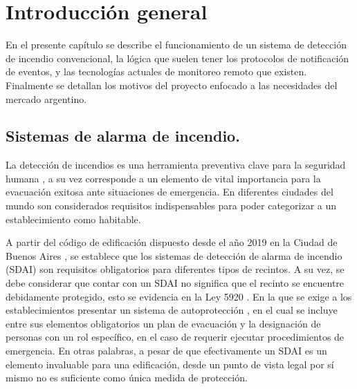 
\chapter{Introducción general} %

\label{Chapter1} %
\label{IntroGeneral}


\newcommand{\keyword}[1]{\textbf{#1}}
\newcommand{\tabhead}[1]{\textbf{#1}}
\newcommand{\code}[1]{\texttt{#1}}
\newcommand{\file}[1]{\texttt{\bfseries#1}}
\newcommand{\option}[1]{\texttt{\itshape#1}}
\newcommand{\grados}{$^{\circ}$}


En el presente capítulo se describe el funcionamiento de un sistema de detección de incendio convencional, la lógica que suelen tener los protocolos de notificación de eventos, y las tecnologías actuales de monitoreo remoto que existen. Finalmente se detallan los motivos del proyecto enfocado a las necesidades del mercado argentino. 


\section{Sistemas de alarma de incendio.}
%
La detección de incendios es una herramienta preventiva clave para la seguridad humana \citep{rev_innov_1}, a su vez corresponde a un elemento de vital importancia para la evacuación exitosa ante situaciones de emergencia. En diferentes ciudades del mundo son considerados requisitos indispensables para poder categorizar a un establecimiento como habitable.

A partir del código de edificación dispuesto desde el año 2019 en la Ciudad de Buenos Aires \citep{cod_edif}, se establece que los sistemas de detección de alarma de incendio (SDAI) son requisitos obligatorios para diferentes tipos de recintos. A su vez, se debe considerar que contar con un SDAI no significa que el recinto se encuentre debidamente protegido, esto se evidencia en la Ley 5920 \citep{ley_5920}. En la que se exige a los establecimientos presentar un sistema de autoprotección \citep{rev_innov_2}, en el cual se incluye entre sus elementos obligatorios un plan de evacuación y la designación de personas con un rol específico, en el caso de requerir ejecutar procedimientos de emergencia. En otras palabras, a pesar de que efectivamente un SDAI es un elemento invaluable para una edificación, desde un punto de vista legal por sí mismo no es suficiente como única medida de protección. 

